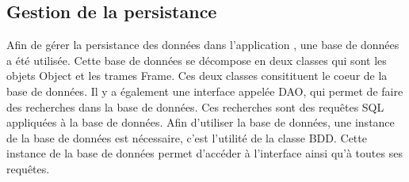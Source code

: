 \subsection{Gestion de la persistance}

\medskip

Afin de gérer la persistance des données dans l'application {\nomApplication}, une base de données a été utilisée. Cette base de données se décompose en deux classes qui sont les objets Object et les trames Frame. Ces deux classes consitituent le coeur de la base de données. 
Il y a également une interface appelée DAO, qui permet de faire des recherches dans la base de données. Ces recherches sont des requêtes SQL appliquées à la base de données. Afin d'utiliser la base de données, une instance de la base de données est nécessaire, c'est l'utilité de la classe BDD. Cette instance de la base de données permet d'accéder à l'interface ainsi qu'à toutes ses requêtes. 
